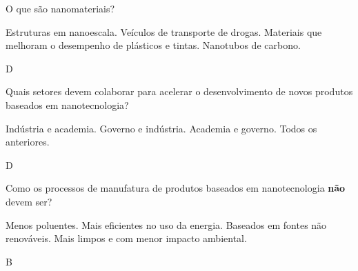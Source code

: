 \documentclass[10pt]{scrartcl}
\begin{document}
\begin{exercise}[points=1]
O que são nanomateriais?
\begin{choice}
\choice Estruturas em nanoescala.
\choice Veículos de transporte de drogas.
\choice Materiais que melhoram o desempenho de plásticos e tintas.
\choice Nanotubos de carbono.
\end{choice}
\end{exercise}
\begin{solution}
D
\end{solution}





\begin{exercise}[points=1]
Quais setores devem colaborar para acelerar o desenvolvimento de novos produtos baseados em nanotecnologia?
\begin{choice}
\choice Indústria e academia.
\choice Governo e indústria.
\choice Academia e governo.
\choice Todos os anteriores.
\end{choice}
\end{exercise}
\begin{solution}
D
\end{solution}


\begin{exercise}[points=1]
Como os processos de manufatura de produtos baseados em nanotecnologia \textbf{não} devem ser?
\begin{choice}
\choice Menos poluentes.
\choice Mais eficientes no uso da energia.
\choice Baseados em fontes não renováveis.
\choice Mais limpos e com menor impacto ambiental.
\end{choice}
\end{exercise}
\begin{solution}
B
\end{solution}





\end{document}
